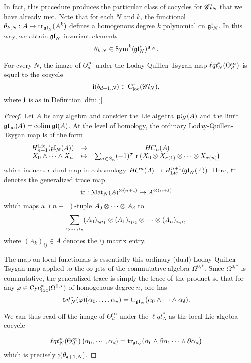In fact, this procedure produces the particular class of cocycles for $\mathscr G l_{N}$ that we have already met. 
Note that for each $N$ and $k$, the functional $\theta_{k,N} : A \mapsto {\rm tr}_{{\mathfrak{gl}}_N} (A^k)$ defines a homogenous degree $k$ polynomial on ${\mathfrak{gl}}_N$. 
In this way, we obtain ${\mathfrak{gl}}_N$-invariant elements
\[
\theta_{k,N} \in {\rm Sym}^{k}({\mathfrak{gl}}_N^*)^{{\mathfrak{gl}}_N} .
\]

\begin{lem}
For every $N$, the image of $\Theta_d^\infty$ under the Loday-Quillen-Tsygan map ${\ell q t}_N^*(\Theta_d^\infty)$ is equal to the cocycle
\[
\mathfrak j(\theta_{d+1, N}) \in {\rm C}_{\rm loc}^*(\mathscr G l_N),
\]
where $\mathfrak j$ is as in Definition \ref{dfn: j}
\end{lem}

\begin{proof}
Let $A$ be any algebra and consider the Lie algebra ${\mathfrak{gl}}_N(A)$ and the limit $\mathfrak{g} \mathfrak{l}_\infty(A) = {\rm colim} \; {\mathfrak{gl}} (A)$. 
At the level of homology, the ordinary Loday-Quillen-Tsygan map is of the form
\[
\begin{array}{ccc}
H_{n+1}^{\rm Lie}({\mathfrak{gl}}_N(A)) & \to & HC_{n}(A) \\
X_0 \wedge \cdots \wedge X_n & \mapsto & \sum_{\sigma \in S_n} (-1)^{\sigma} {\rm tr} \left(X_0 \otimes X_{\sigma(1)} \otimes\cdots \otimes X_{\sigma(n)} \right) 
\end{array}
\] 
which induces a dual map in cohomology $HC^n(A) \to H^{n+1}_{\rm Lie}({\mathfrak{gl}}_N(A))$. 
Here, ${\rm tr}$ denotes the generalized trace map
\[
{\rm tr} : {\rm Mat}_N(A)^{\otimes(n+1)} \to A^{\otimes (n+1)} 
\]
which maps a $(n+1)$-tuple $A_0\otimes \cdots \otimes A_d$ to 
\[
\sum_{i_0,\ldots,i_n} (A_0)_{i_0 i_1} \otimes (A_1)_{i_1i_2} \otimes \cdots \otimes (A_n)_{i_n i_0}
\]
where $(A_k)_{ij} \in A$ denotes the $ij$ matrix entry.

The map on local functionals is essentially this ordinary (dual) Loday-Quillen-Tsygan map applied to the $\infty$-jets of the commutative algebra $\Omega^{0,*}$. 
Since $\Omega^{0,*}$ is commutative, the generalized trace is simply the trace of the product so that for any $\varphi \in {\rm Cyc}_{\rm loc}^*(\Omega^{0,*})$ of homogenous degree $n$, one has
\[
{\ell q t}_N^*(\varphi) (\alpha_0,\ldots,\alpha_n) = {\rm tr}_{{\mathfrak{gl}}_N}(\alpha_0 \wedge \cdots \wedge \alpha_d) . 
\]

We can thus read off the image of $\Theta^\infty_d$ under the $\ell q t_N^*$ as the local Lie algebra cocycle

\begin{align*}
\ell q t_N^*(\Theta_d^\infty)\left(\alpha_0, \cdots, \alpha_d) = {\rm tr}_{{\mathfrak{gl}}_N}(\alpha_0 \wedge \partial \alpha_1 \cdots \wedge \partial \alpha_d\right)
\end{align*}
which is precisely $\mathfrak j(\theta_{d+1,N})$. 
\end{proof}



